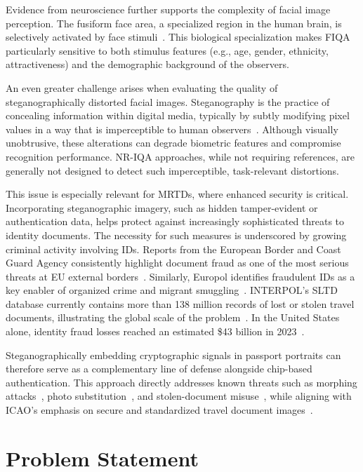 Evidence from neuroscience further supports the complexity of facial image perception. The fusiform face area, a specialized region in the human brain, is selectively activated by face stimuli~\cite{kanwisher2006fusiform, tsao2008mechanisms}. This biological specialization makes \acs{FIQA} particularly sensitive to both stimulus features (e.g., age, gender, ethnicity, attractiveness) and the demographic background of the observers.

An even greater challenge arises when evaluating the quality of steganographically distorted facial images. Steganography is the practice of concealing information within digital media, typically by subtly modifying pixel values in a way that is imperceptible to human observers~\cite{morkel2005steganography}. Although visually unobtrusive, these alterations can degrade biometric features and compromise recognition performance. \acf{NR-IQA} approaches, while not requiring references, are generally not designed to detect such imperceptible, task-relevant distortions.

This issue is especially relevant for \acs{MRTDs}, where enhanced security is critical. Incorporating steganographic imagery, such as hidden tamper-evident or authentication data, helps protect against increasingly sophisticated threats to identity documents. The necessity for such measures is underscored by growing criminal activity involving IDs. Reports from the European Border and Coast Guard Agency consistently highlight document fraud as one of the most serious threats at EU external borders~\cite{frontex2023risk}. Similarly, Europol identifies fraudulent IDs as a key enabler of organized crime and migrant smuggling~\cite{europol2022crime}. INTERPOL's \acf{SLTD} database currently contains more than 138 million records of lost or stolen travel documents, illustrating the global scale of the problem~\cite{interpol2023sltd}. In the United States alone, identity fraud losses reached an estimated \$43 billion in 2023~\cite{javelin2023fraud}.

Steganographically embedding cryptographic signals in passport portraits can therefore serve as a complementary line of defense alongside chip-based authentication. This approach directly addresses known threats such as morphing attacks~\cite{frontex2019morphing}, photo substitution~\cite{icao2015}, and stolen-document misuse~\cite{interpol2023sltd}, while aligning with \acs{ICAO}'s emphasis on secure and standardized travel document images~\cite{icao2015}.

\section{Problem Statement}\label{sec:problem_statement}

